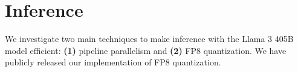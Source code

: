 \section{Inference}
\label{section:inference}
We investigate two main techniques to make inference with the Llama 3 405B model efficient: \textbf{(1)} pipeline parallelism and \textbf{(2)} FP8 quantization.
We have publicly released our implementation of FP8 quantization.



